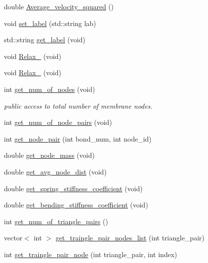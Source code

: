 \begin{DoxyCompactItemize}
\item 
double \mbox{\hyperlink{classMembrane_a27459fc890e1bc91b9decf1f24593863}{Average\+\_\+velocity\+\_\+squared}} ()
\item 
void \mbox{\hyperlink{classMembrane_a5d37c481f978d04a64ea0fd10f5e7708}{set\+\_\+label}} (std\+::string lab)
\item 
std\+::string \mbox{\hyperlink{classMembrane_ad59ce2bce11ba48c2a0fc0a86cfca6eb}{get\+\_\+label}} (void)
\item 
void \mbox{\hyperlink{classMembrane_a61d5561da6e815e1b75ac971121fdd28}{Relax\+\_}} (void)
\item 
void \mbox{\hyperlink{classMembrane_ad9b20c6a4e11da731a7981e47b7e35c5}{Relax\+\_}} (void)
\item 
int \mbox{\hyperlink{classMembrane_a7ab07bf9d307d2e2b8e457a9167fff78}{get\+\_\+num\+\_\+of\+\_\+nodes}} (void)
\begin{DoxyCompactList}\small\item\em public access to total number of membrane nodes. \end{DoxyCompactList}\item 
int \mbox{\hyperlink{classMembrane_a8dba8af8f79eeb588edfea309e530368}{get\+\_\+num\+\_\+of\+\_\+node\+\_\+pairs}} (void)
\item 
int \mbox{\hyperlink{classMembrane_a522229db4c05a0a927c1c9ac3bf29915}{get\+\_\+node\+\_\+pair}} (int bond\+\_\+num, int node\+\_\+id)
\item 
double \mbox{\hyperlink{classMembrane_a7b6e284f4bba349da2ddc1c14f914dc7}{get\+\_\+node\+\_\+mass}} (void)
\item 
double \mbox{\hyperlink{classMembrane_a32ed30019d57e8d4e51341709a8997f2}{get\+\_\+avg\+\_\+node\+\_\+dist}} (void)
\item 
double \mbox{\hyperlink{classMembrane_a7076d2f0d0e1d39e74d35f6dbb193103}{get\+\_\+spring\+\_\+stiffness\+\_\+coefficient}} (void)
\item 
double \mbox{\hyperlink{classMembrane_ae1e3082fdde5dbef11fb6c3b7cc97c0a}{get\+\_\+bending\+\_\+stiffness\+\_\+coefficient}} (void)
\item 
int \mbox{\hyperlink{classMembrane_a7aefd8327b0c02828efc321fd1ae7f07}{get\+\_\+num\+\_\+of\+\_\+triangle\+\_\+pairs}} ()
\item 
vector$<$ int $>$ \mbox{\hyperlink{classMembrane_a6aaf6705d45dcc224eceace9670c15f9}{get\+\_\+traingle\+\_\+pair\+\_\+nodes\+\_\+list}} (int triangle\+\_\+pair)
\item 
int \mbox{\hyperlink{classMembrane_a30add8aa4bd6a4f03cdb3fd3e1b68ff9}{get\+\_\+traingle\+\_\+pair\+\_\+node}} (int triangle\+\_\+pair, int index)

\end{DoxyCompactItemize}
